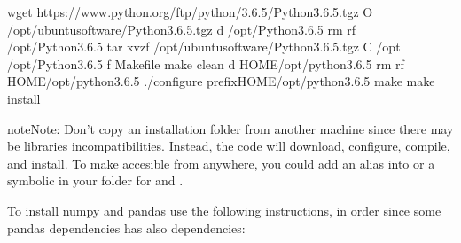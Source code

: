 \documentclass[letterpaper,10pt,english]{sphinxmanual}
\begin{document}
%
\begin{sphinxVerbatim}[commandchars=\\\{\}]
wget https://www.python.org/ftp/python/3.6.5/Python\PYGZhy{}3.6.5.tgz 
\PYGZhy{}O \PYGZti{}/opt/ubuntu\PYGZhy{}software/Python\PYGZhy{}3.6.5.tgz
 \PYG{o}{[} \PYGZhy{}d \PYGZti{}/opt/Python\PYGZhy{}3.6.5 \PYG{o}{]}  rm \PYGZhy{}rf \PYGZti{}/opt/Python\PYGZhy{}3.6.5 
tar xvzf \PYGZti{}/opt/ubuntu\PYGZhy{}software/Python\PYGZhy{}3.6.5.tgz \PYGZhy{}C \PYGZti{}/opt
 \PYGZti{}/opt/Python\PYGZhy{}3.6.5
 \PYG{o}{[} \PYGZhy{}f Makefile \PYG{o}{]}  make clean 
 \PYG{o}{[} \PYGZhy{}d HOME/opt/python\PYGZhy{}3.6.5 \PYG{o}{]}  rm \PYGZhy{}rf HOME/opt/python\PYGZhy{}3.6.5 
./configure \PYGZhy{}\PYGZhy{}prefixHOME/opt/python\PYGZhy{}3.6.5
make
make install
\end{sphinxVerbatim}

\begin{sphinxadmonition}{note}{Note:}
Don’t copy an installation folder from another machine since there may be
libraries incompatibilities. Instead, the code will download, configure,
compile, and install. To make accesible from anywhere, you could add an
alias into  or a symbolic in your  folder for
 and .
\end{sphinxadmonition}

To install numpy and pandas use the following instructions, in order since some
pandas dependencies has also dependencies:
\end{document}

